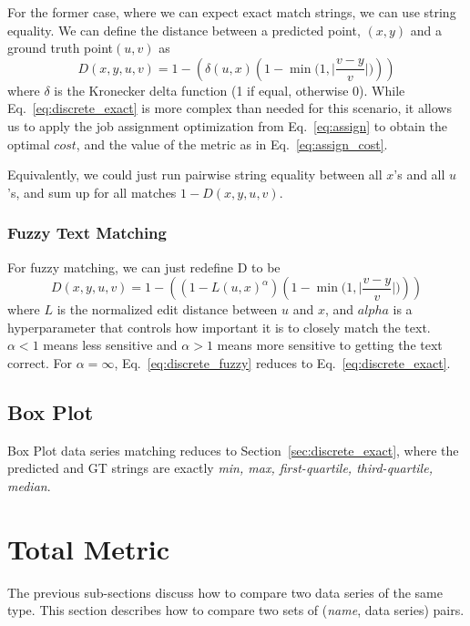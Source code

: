 \documentclass[a4paper,11pt]{scrartcl}
\begin{document}
For the former case, where we can expect exact match strings, we can use string equality.
We can define the distance between a predicted point, $(x, y)$ and a ground truth point$(u, v)$ as
\begin{equation} \label{eq:discrete_exact}
D(x,y,u,v) = 1 - (\delta(u, x) (1 - \min \Big(1, \Big| \frac{v - y}{v} \Big| \Big)))
\end{equation}
where $\delta$ is the Kronecker delta function (1 if equal, otherwise 0).
While Eq.~\ref{eq:discrete_exact} is more complex than needed for this scenario, it allows us to apply the job assignment optimization from Eq.~\ref{eq:assign} to obtain the optimal $cost$, and the value of the metric as in Eq.~\ref{eq:assign_cost}.

Equivalently, we could just run pairwise string equality between all $x$'s and all $u$'s, and sum up for all matches $1 - D(x,y,u,v)$.

\subsubsection{Fuzzy Text Matching}

For fuzzy matching, we can just redefine D to be
\begin{equation} \label{eq:discrete_fuzzy}
D(x,y,u,v) = 1 - ((1 - L(u, x)^\alpha) (1 - \min \Big(1, \Big| \frac{v - y}{v} \Big| \Big)))
\end{equation}
where $L$ is the normalized edit distance between $u$ and $x$, and $alpha$ is a hyperparameter that controls how important it is to closely match the text.
$\alpha < 1$ means less sensitive and $\alpha > 1$ means more sensitive to getting the text correct.
For $\alpha = \infty$, Eq.~\ref{eq:discrete_fuzzy} reduces to Eq.~\ref{eq:discrete_exact}.

\subsection{Box Plot}

Box Plot data series matching reduces to Section~\ref{sec:discrete_exact}, where the predicted and GT strings are exactly \emph{min, max, first-quartile, third-quartile, median}.

\section{Total Metric}

The previous sub-sections discuss how to compare two data series of the same type.
This section describes how to compare two sets of (\emph{name}, data series) pairs.
\end{document}
